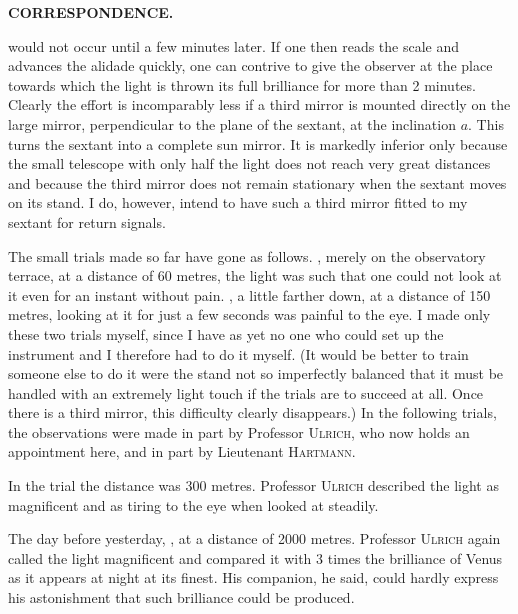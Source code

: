 \par\clearpage
\noindent{}\hfill{\small\textbf{CORRESPONDENCE.}}\hfill\null\par\medskip
\noindent would not occur until a few minutes later. If one then reads the scale and advances the alidade quickly, one can contrive to give the observer at the place towards which the light is thrown its full brilliance for more than 2 minutes. Clearly the effort is incomparably less if a third mirror is mounted directly on the large mirror, perpendicular to the plane of the sextant, at the inclination $a$. This turns the sextant into a complete sun mirror. It is markedly inferior only because the small telescope with only half the light does not reach very great distances and because the third mirror does not remain stationary when the sextant moves on its stand. I do, however, intend to have such a third mirror fitted to my sextant for return signals.

\par\noindent\hspace*{\parindent}The small trials made so far have gone as follows. , merely on the observatory terrace, at a distance of 60 metres, the light was such that one could not look at it even for an instant without pain. , a little farther down, at a distance of 150 metres, looking at it for just a few seconds was painful to the eye. I made only these two trials myself, since I have as yet no one who could set up the instrument and I therefore had to do it myself. (It would be better to train someone else to do it were the stand not so imperfectly balanced that it must be handled with an extremely light touch if the trials are to succeed at all. Once there is a third mirror, this difficulty clearly disappears.) In the following trials, the observations were made in part by Professor \textsc{Ulrich}, who now holds an appointment here, and in part by Lieutenant \textsc{Hartmann}.

\par\noindent\hspace*{\parindent}In the  trial the distance was 300 metres. Professor \textsc{Ulrich} described the light as magnificent and as tiring to the eye when looked at steadily.

\par\noindent\hspace*{\parindent}The day before yesterday, , at a distance of 2000 metres. Professor \textsc{Ulrich} again called the light magnificent and compared it with 3 times the brilliance of Venus as it appears at night at its finest. His companion, he said, could hardly express his astonishment that such brilliance could be produced.

